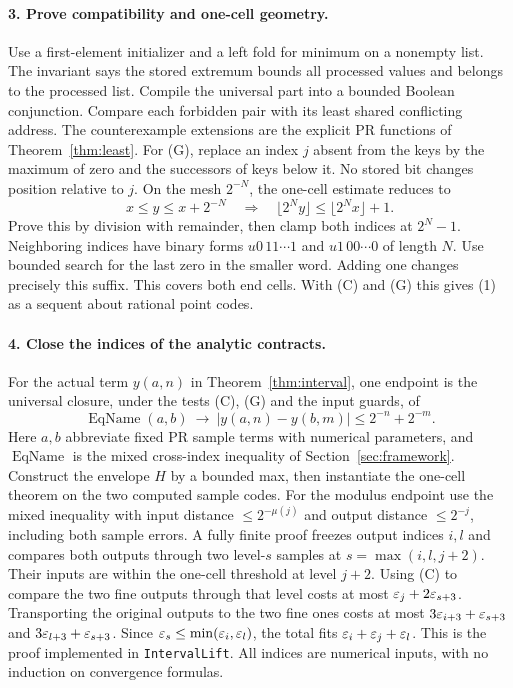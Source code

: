 \paragraph{3. Prove compatibility and one-cell geometry.}
Use a first-element initializer and a left fold for minimum on a nonempty list. The invariant says the stored extremum bounds all processed values and belongs to the processed list. Compile the universal part into a bounded Boolean conjunction. Compare each forbidden pair with its least shared conflicting address. The counterexample extensions are the explicit PR functions of Theorem~\ref{thm:least}. For (G), replace an index $j$ absent from the keys by the maximum of zero and the successors of keys below it. No stored bit changes position relative to $j$. On the mesh $2^{-N}$, the one-cell estimate reduces to
\[
 x\le y\le x+2^{-N}\quad\Longrightarrow\quad
        \lfloor2^Ny\rfloor\le \lfloor2^Nx\rfloor+1 .
\]
Prove this by division with remainder, then clamp both indices at $2^N-1$. Neighboring indices have binary forms $u0\,11\cdots1$ and $u1\,00\cdots0$ of length $N$. Use bounded search for the last zero in the smaller word. Adding one changes precisely this suffix. This covers both end cells. With (C) and (G) this gives (1) as a sequent about rational point codes.

\paragraph{4. Close the indices of the analytic contracts.}
For the actual term $y(a,n)$ in Theorem~\ref{thm:interval}, one endpoint is the universal closure, under the tests (C), (G) and the input guards, of
\[
 \operatorname{EqName}(a,b)\ \longrightarrow\
 |y(a,n)-y(b,m)|\le 2^{-n}+2^{-m}.
\]
Here $a,b$ abbreviate fixed PR sample terms with numerical parameters, and $\operatorname{EqName}$ is the mixed cross-index inequality of Section~\ref{sec:framework}. Construct the envelope $H$ by a bounded max, then instantiate the one-cell theorem on the two computed sample codes. For the modulus endpoint use the mixed inequality with input distance $\le2^{-\mu(j)}$ and output distance $\le2^{-j}$, including both sample errors. A fully finite proof freezes output indices $i,l$ and compares both outputs through two level-$s$ samples at $s=\max(i,l,j+2)$. Their inputs are within the one-cell threshold at level $j+2$. Using (C) to compare the two fine outputs through that level costs at most $\varepsilon_j+2\varepsilon_{s+3}$. Transporting the original outputs to the two fine ones costs at most $3\varepsilon_{i+3}+\varepsilon_{s+3}$ and $3\varepsilon_{l+3}+\varepsilon_{s+3}$. Since $\varepsilon_s\le\min(\varepsilon_i,\varepsilon_l)$, the total fits $\varepsilon_i+\varepsilon_j+\varepsilon_l$. This is the proof implemented in \texttt{IntervalLift}. All indices are numerical inputs, with no induction on convergence formulas.

